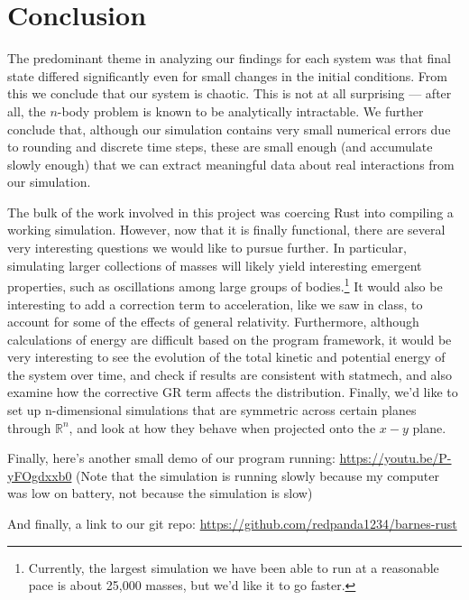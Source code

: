 \documentclass[cm, 10pt]{article}
\newcommand\RR{{\mathbb R}}
\begin{document}
\section{Conclusion}
The predominant theme in analyzing our findings for each system was
that final state differed significantly even for small changes in the
initial conditions. From this we conclude that our system is chaotic.
This is not at all surprising --- after all, the $n$-body problem is
known to be analytically intractable. We further conclude that,
although our simulation contains very small numerical errors due to
rounding and discrete time steps, these are small enough (and
accumulate slowly enough) that we can extract meaningful data about
real interactions from our simulation.

The bulk of the work involved in this project was coercing Rust into
compiling a working simulation. However, now that it is finally
functional, there are several very interesting questions we would like
to pursue further. In particular, simulating larger collections of
masses will likely yield interesting emergent properties, such as
oscillations among large groups of bodies.\footnote{Currently, the
  largest simulation we have been able to run at a reasonable pace is
  about 25,000 masses, but we'd like it to go faster.} It would also
be interesting to add a correction term to acceleration, like we saw
in class, to account for some of the effects of general relativity.
Furthermore, although calculations of energy are difficult based on
the program framework, it would be very interesting to see the
evolution of the total kinetic and potential energy of the system over
time, and check if results are consistent with statmech, and also
examine how the corrective GR term affects the distribution. Finally,
we'd like to set up n-dimensional simulations that are symmetric
across certain planes through $\RR^n$, and look at how they behave
when projected onto the $x-y$ plane.

Finally, here's another small demo of our program running:
\url{https://youtu.be/P-yFOgdxxb0} (Note that the simulation is
running slowly because my computer was low on battery, not because the
simulation is slow)

And finally, a link to our git repo:
\url{https://github.com/redpanda1234/barnes-rust}
\end{document}
